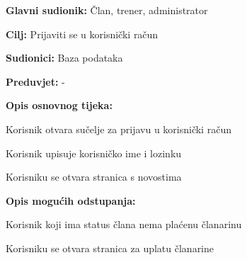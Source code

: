						\noindent {}
					\begin{packed_item}
						
						\item \textbf{Glavni sudionik: } Član, trener, administrator
						\item  \textbf{Cilj: } Prijaviti se u korisnički račun
						\item  \textbf{Sudionici: } Baza podataka
						\item  \textbf{Preduvjet: } -
						\item  \textbf{Opis osnovnog tijeka:}
						
						\item[] \begin{packed_enum}
							
							\item Korisnik otvara sučelje za prijavu u korisnički račun
							\item Korisnik upisuje korisničko ime i lozinku
							\item Korisniku se otvara stranica s novostima
							
						\end{packed_enum}
						
						\item  \textbf{Opis mogućih odstupanja:}
						
						\item[] \begin{packed_item}
							
							\item[3.a] Korisnik koji ima status člana nema plaćenu članarinu
							\item[] \begin{packed_enum}
								
								\item Korisniku se otvara stranica za uplatu članarine
								
							\end{packed_enum}
							
						\end{packed_item}
					\end{packed_item}
				
					\eject
				
